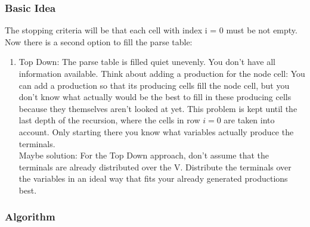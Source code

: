 \subsubsection{Basic Idea} 
The stopping criteria will be that each cell with index i = 0 must be not empty.
Now there is a second option to fill the parse table:
\begin{enumerate}
	\item Top Down: The parse table is filled quiet unevenly. You don't have all information available. Think about adding a production for the node cell: You can add a production so that its producing cells fill the node cell, but you don't know what actually would be the best to fill in these producing cells because they themselves aren't looked at yet. This problem is kept until the last depth of the recursion, where the cells in row $i=0$ are taken into account. Only starting there you know what variables actually produce the terminals.\\
	Maybe solution: For the Top Down approach, don't assume that the terminals are already distributed over the V. Distribute the terminals over the variables in an ideal way that fits your already generated productions best.
\end{enumerate}
\subsubsection{Algorithm}
\vspace{8cm}
\noindent
{}

